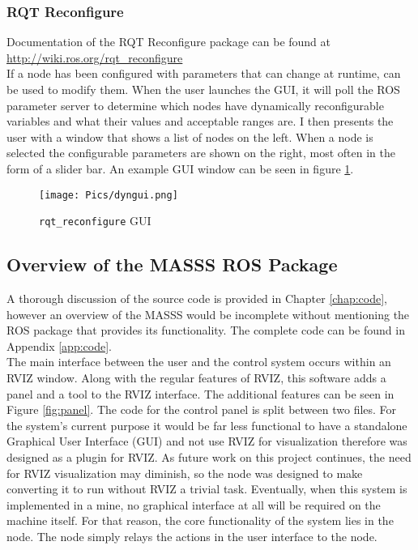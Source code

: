 \subsubsection{RQT Reconfigure}

Documentation of the RQT Reconfigure package can be found at \url{http://wiki.ros.org/rqt_reconfigure}\\

If a node has been configured with parameters that can change at runtime,  can be used to modify them. When the user launches the GUI, it will poll the ROS parameter server to determine which nodes have dynamically reconfigurable variables and what their values and acceptable ranges are. I then presents the user with a window that shows a list of nodes on the left. When a node is selected the configurable parameters are shown on the right, most often in the form of a slider bar. An example  GUI window can be seen in figure \ref{fig:dyngui2}.

\begin{figure}[h]
    \centering
    \texttt{[image: Pics/dyngui.png]}
    \caption{\texttt{rqt\_reconfigure} GUI}
    \label{fig:dyngui2}
\end{figure}

\subsection{Overview of the MASSS ROS Package}
\label{sub:software}

A thorough discussion of the source code is provided in Chapter \ref{chap:code}, however an overview of the MASSS would be incomplete without mentioning the ROS package that provides its functionality. The complete code can be found in Appendix \ref{app:code}.\\ 

The main interface between the user and the control system occurs within an RVIZ window. Along with the regular features of RVIZ, this software adds a panel and a tool to the RVIZ interface. The additional features can be seen in Figure \ref{fig:panel}. The code for the control panel is split between two files. For the system's current purpose it would be far less functional to have a standalone Graphical User Interface (GUI) and not use RVIZ for visualization therefore  was designed as a plugin for RVIZ. As future work on this project continues, the need for RVIZ visualization may diminish, so the node was designed to make converting it to run without RVIZ a trivial task. Eventually, when this system is implemented in a mine, no graphical interface at all will be required on the machine itself. For that reason, the core functionality of the system lies in the  node. The  node simply relays the actions in the user interface to the  node.\\

